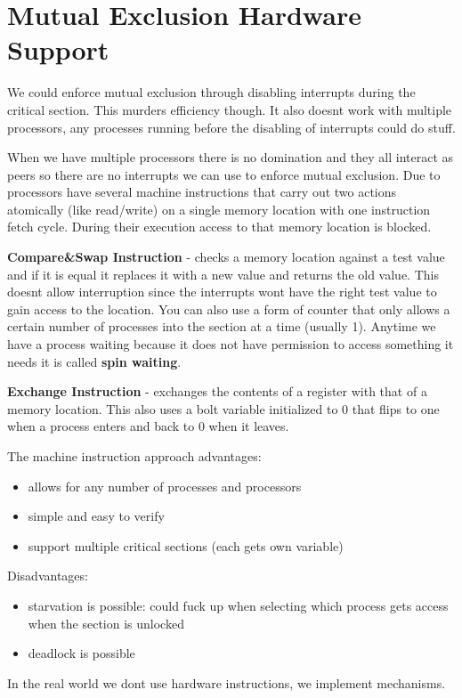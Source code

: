 \documentclass[12pt]{article}
\begin{document}
\section{Mutual Exclusion Hardware Support}
We could enforce mutual exclusion through disabling interrupts during the critical section. This murders efficiency though. It also doesnt work with multiple processors, any processes running before the disabling of interrupts could do stuff.

When we have multiple processors there is no domination and they all interact as peers so there are no interrupts we can use to enforce mutual exclusion. Due to processors have several machine instructions that carry out two actions atomically (like read/write) on a single memory location with one instruction fetch cycle. During their execution access to that memory location is blocked.

\textbf{Compare\&Swap Instruction} - checks a memory location against a test value and if it is equal it replaces it with a new value and returns the old value. This doesnt allow interruption since the interrupts wont have the right test value to gain access to the location. You can also use a form of counter that only allows a certain number of processes into the section at a time (usually     1). Anytime we have a process waiting because it does not have permission to access something it needs it is called \textbf{spin waiting}.

\textbf{Exchange Instruction} - exchanges the contents of a register with that of a memory location. This also uses a bolt variable initialized to 0 that flips to one when a process enters and back to 0 when it leaves.

The machine instruction approach advantages:
\begin{itemize}
    \item allows for any number of processes and processors
    \item simple and easy to verify
    \item support multiple critical sections (each gets own variable)
\end{itemize}
Disadvantages:
\begin{itemize}
    \item starvation is possible: could fuck up when selecting which process gets access when the section is unlocked
    \item deadlock is possible
\end{itemize}
In the real world we dont use hardware instructions, we implement mechanisms.
\end{document}
